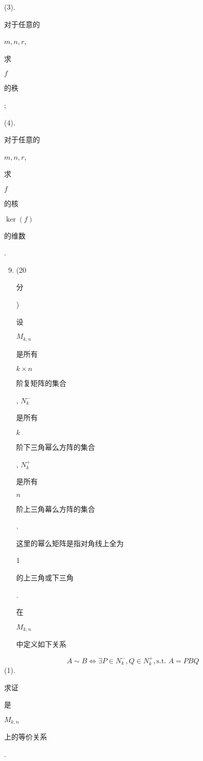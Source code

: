 \documentclass[10pt]{article}
\begin{document}
(3). \begin{CJK}{UTF8}{mj}对于任意的\end{CJK} $m, n, r$, \begin{CJK}{UTF8}{mj}求\end{CJK} $f$ \begin{CJK}{UTF8}{mj}的秩\end{CJK};

(4). \begin{CJK}{UTF8}{mj}对于任意的\end{CJK} $m, n, r$, \begin{CJK}{UTF8}{mj}求\end{CJK} $f$ \begin{CJK}{UTF8}{mj}的核\end{CJK} $\operatorname{ker}(f)$ \begin{CJK}{UTF8}{mj}的维数\end{CJK}.

\begin{enumerate}
  \setcounter{enumi}{8}
  \item (20 \begin{CJK}{UTF8}{mj}分\end{CJK}) \begin{CJK}{UTF8}{mj}设\end{CJK} $M_{k, n}$ \begin{CJK}{UTF8}{mj}是所有\end{CJK} $k \times n$ \begin{CJK}{UTF8}{mj}阶复矩阵的集合\end{CJK}, $N_{k}^{-}$\begin{CJK}{UTF8}{mj}是所有\end{CJK} $k$ \begin{CJK}{UTF8}{mj}阶下三角幂么方阵的集合\end{CJK}, $N_{k}^{+}$ \begin{CJK}{UTF8}{mj}是所有\end{CJK} $n$ \begin{CJK}{UTF8}{mj}阶上三角幕么方阵的集合\end{CJK}.\begin{CJK}{UTF8}{mj}这里的幂么矩阵是指对角线上全为\end{CJK} 1 \begin{CJK}{UTF8}{mj}的上三角或下三角\end{CJK}.\begin{CJK}{UTF8}{mj}在\end{CJK} $M_{k, n}$ \begin{CJK}{UTF8}{mj}中定义如下关系\end{CJK}
\end{enumerate}
$$
A \sim B \Leftrightarrow \exists P \in N_{k}^{-}, Q \in N_{k}^{+}, \text {s.t. } A=P B Q
$$
(1). \begin{CJK}{UTF8}{mj}求证\end{CJK} \begin{CJK}{UTF8}{mj}是\end{CJK} $M_{k, n}$ \begin{CJK}{UTF8}{mj}上的等价关系\end{CJK}.
\end{document}
